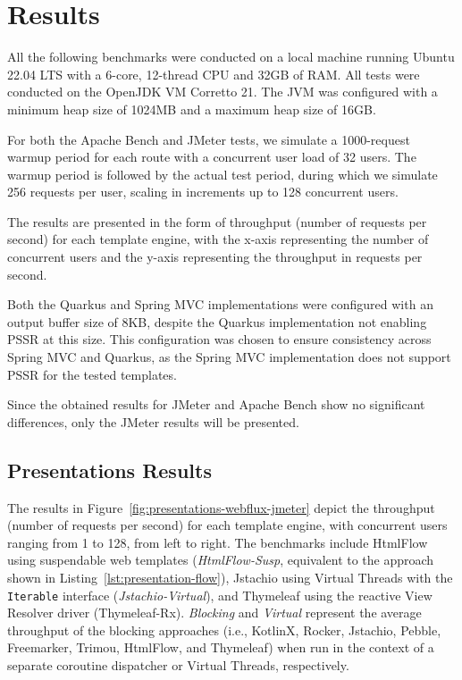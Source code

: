 \section{Results}

All the following benchmarks were conducted on a local machine running Ubuntu
22.04 LTS with a 6-core, 12-thread CPU and 32GB of RAM\@. All tests were
conducted on the OpenJDK VM Corretto 21. The JVM was configured with a minimum
heap size of 1024MB and a maximum heap size of 16GB\@.

For both the Apache Bench and JMeter tests, we simulate a 1000-request warmup
period for each route with a concurrent user load of 32 users. The warmup
period is followed by the actual test period, during which we simulate 256
requests per user, scaling in increments up to 128 concurrent users.

The results are presented in the form of throughput (number of requests per
second) for each template engine, with the x-axis representing the number of
concurrent users and the y-axis representing the throughput in requests per
second.

Both the Quarkus and Spring MVC implementations were configured with an output
buffer size of 8KB, despite the Quarkus implementation not enabling PSSR at
this size. This configuration was chosen to ensure consistency across Spring
MVC and Quarkus, as the Spring MVC implementation does not support PSSR for the
tested templates.

Since the obtained results for JMeter and Apache Bench show no significant
differences, only the JMeter results will be presented.

\subsection{Presentations Results}

The results in Figure~\ref{fig:presentations-webflux-jmeter} depict the
throughput (number of requests per second) for each template engine, with
concurrent users ranging from 1 to 128, from left to right. The benchmarks
include HtmlFlow using suspendable web templates (\textit{HtmlFlow-Susp},
equivalent to the approach shown in Listing~\ref{lst:presentation-flow}),
Jstachio using Virtual Threads with the \texttt{Iterable} interface
(\textit{Jstachio-Virtual}), and Thymeleaf using the reactive View Resolver
driver (Thymeleaf-Rx).
\textit{Blocking} and \textit{Virtual} represent the average throughput of the
blocking approaches (i.e., KotlinX, Rocker, Jstachio, Pebble, Freemarker,
Trimou, HtmlFlow, and Thymeleaf) when run in the context of a separate
coroutine dispatcher or Virtual Threads, respectively.

